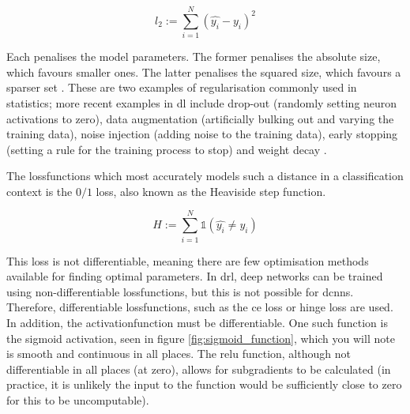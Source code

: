 \begin{equation}
l_2 := \sum_{i = 1}^N (\hat{y_i} - y_i)^2
\end{equation}

Each penalises the model parameters. The former penalises the absolute size, which favours smaller ones. The latter penalises the squared size, which favours a sparser set \cite{ridge_lasso}. These are two examples of regularisation commonly used in statistics; more recent examples in \gls{dl} include drop-out (randomly setting neuron activations to zero), data augmentation (artificially bulking out and varying the training data), noise injection (adding noise to the training data), early stopping (setting a rule for the training process to stop) and weight decay \cite[Chapter~7]{good_fellow_2016}.  %
\bigskip

The \gls{lossfunction}s which most accurately models such a distance in a classification context is the $0/1$ loss, also known as the Heaviside step function.

\begin{equation}
H := \sum_{i = 1}^N \mathds{1} (\hat{y_i} \neq y_i)  
\end{equation}

This loss is not differentiable, meaning there are few optimisation methods available for finding optimal parameters. In \gls{drl}, deep networks can be trained using non-differentiable \gls{lossfunction}s, but this is not possible for \gls{dcnn}s. Therefore, differentiable \gls{lossfunction}s, such as the \gls{ce} loss or hinge loss are used. In addition, the \gls{activationfunction} must be differentiable. One such function is the sigmoid activation, seen in figure \ref{fig:sigmoid_function}, which you will note is smooth and continuous in all places. The \gls{relu} function, although not differentiable in all places (at zero), allows for subgradients to be calculated (in practice, it is unlikely the input to the function would be sufficiently close to zero for this to be uncomputable).
\bigskip



%
%
%




